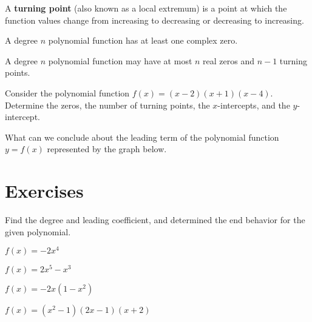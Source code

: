 \begin{definition}
  A \textbf{turning point} (also known as a local extremum) is a point at which the function values change from increasing to decreasing or decreasing to increasing.
\end{definition}

\begin{theorem}
  A degree $n$ polynomial function has at least one complex zero.
\end{theorem}


\begin{proposition}
  A degree $n$ polynomial function may have at most $n$ real zeros and $n-1$ turning points.
\end{proposition}

\newpage

\begin{example}
  Consider the polynomial function  $f(x)=(x-2)(x+1)(x-4)$. Determine the zeros, the number of turning points, the $x$-intercepts, and the $y$-intercept.
\end{example}


\begin{example}
  What can we conclude about the leading term of the polynomial function $y=f(x)$ represented by the graph below.\\
\end{example}
\vspace*{-0.4\textheight}


\newpage

\section*{Exercises}

\begin{exercise}
  Find the degree and leading coefficient, and determined the end behavior for the given polynomial.\\
  \begin{enumerate*}
    \item $f(x)=-2x^4$
    \item $f(x)=2x^5-x^3$
    \item $f(x)=-2x(1-x^2)$
    \item $f(x)=(x^2-1)(2x-1)(x+2)$
  \end{enumerate*}
\end{exercise}

